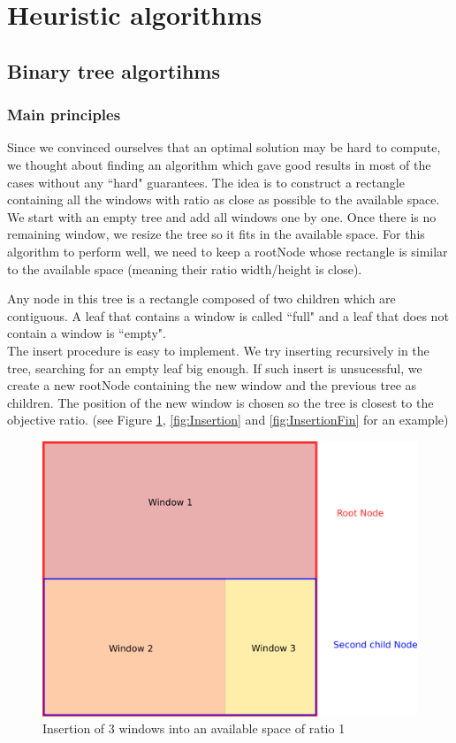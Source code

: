 \documentclass{acmtog}
\begin{document}
\section{Heuristic algorithms}

\subsection{Binary tree algortihms}

\subsubsection{Main principles}

Since we convinced ourselves that an optimal solution may be hard to compute, we thought about finding an algorithm which gave good results in most of the cases without any ``hard" guarantees. The idea is to construct a rectangle containing all the windows with ratio as close as possible to the available space. We start with an empty tree and add all windows one by one. Once there is no remaining window, we resize the tree so it fits in the available space. For this algorithm to perform well, we need to keep a rootNode whose rectangle is similar to the available space (meaning their ratio width/height is close). 

Any node in this tree is a rectangle composed of two children which are contiguous. A leaf that contains a window is called ``full" and a leaf that does not contain a window is ``empty".  \\

The insert procedure is easy to implement. We try inserting recursively in the tree, searching for an empty leaf big enough. If such insert is unsucessful, we create a new rootNode containing the new window and the previous tree as children. The position of the new window is chosen so the tree is closest to the objective ratio. (see Figure \ref{fig:SimpleInsert}, \ref{fig:Insertion} and \ref{fig:InsertionFin} for an example)

\begin{figure}
  \includegraphics[width=\linewidth]{Images/1erDessin.png}
  \caption{Insertion of 3 windows into an available space of ratio 1}
  \label{fig:SimpleInsert}
\end{figure}
\end{document}
